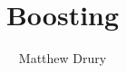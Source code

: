 \documentclass{beamer}
\title{Boosting}
\author{Matthew Drury}
\begin{document}
%
\begin{frame}
  \titlepage
\end{frame}
%

\end{document}
